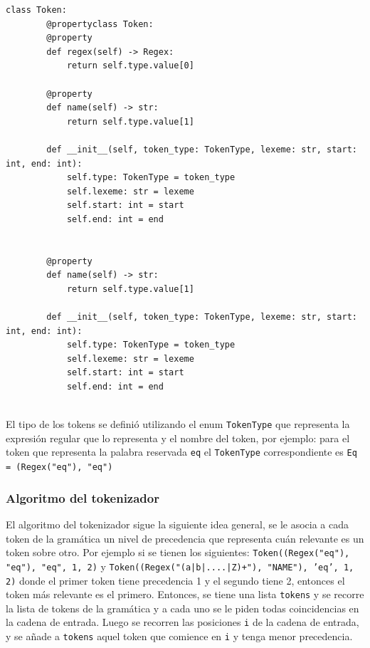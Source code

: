 \begin{verbatim}
class Token:
        @propertyclass Token:
        @property
        def regex(self) -> Regex:
            return self.type.value[0]
    
        @property
        def name(self) -> str:
            return self.type.value[1]
            
        def __init__(self, token_type: TokenType, lexeme: str, start: int, end: int):
            self.type: TokenType = token_type
            self.lexeme: str = lexeme
            self.start: int = start
            self.end: int = end
        
    
        @property
        def name(self) -> str:
            return self.type.value[1]
            
        def __init__(self, token_type: TokenType, lexeme: str, start: int, end: int):
            self.type: TokenType = token_type
            self.lexeme: str = lexeme
            self.start: int = start
            self.end: int = end
        
\end{verbatim}

El tipo de los tokens se definió utilizando el enum \verb|TokenType| que representa la expresión regular que lo representa y el nombre del token, por ejemplo: para el token que representa la palabra reservada \verb|eq| el \verb|TokenType| correspondiente es \verb|Eq = (Regex("eq"), "eq")|

\subsubsection{Algoritmo del tokenizador}

El algoritmo del tokenizador sigue la siguiente idea general, se le asocia a cada token de la gramática un nivel de precedencia que representa cuán relevante es un token sobre otro. Por ejemplo si se tienen los siguientes: \verb|Token((Regex("eq"), "eq"), "eq", 1, 2)| y \texttt{Token((Regex("(a|b|....|Z)+"), "NAME"), 'eq', 1, 2)} donde el primer token tiene precedencia 1 y el segundo tiene 2, entonces el token más relevante es el primero. Entonces, se tiene una lista \verb|tokens| y se recorre la lista de tokens de la gramática y a cada uno se le piden todas coincidencias en la cadena de entrada. Luego se recorren las posiciones \verb|i| de la cadena de entrada, y se añade a \verb|tokens| aquel token que comience en \verb|i| y tenga menor precedencia.

